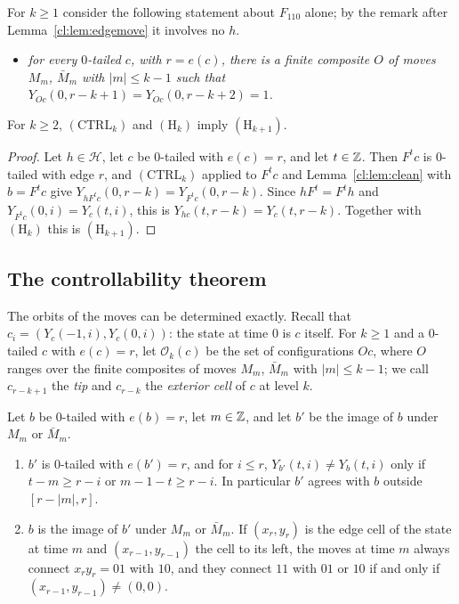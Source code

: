 For $k\ge1$ consider the following statement about $F_{110}$ alone; by the remark after Lemma~\ref{cl:lem:edgemove} it involves no $h$.
\begin{itemize}
\item[$(\mathrm{CTRL}_k)$] \emph{for every $0$-tailed $c$, with $r=e(c)$, there is a finite composite $O$ of moves $M_m$, $\bar M_m$ with $|m|\le k-1$ such that $Y_{Oc}(0,r-k+1)=Y_{Oc}(0,r-k+2)=1$.}
\end{itemize}

\begin{proposition}\label{cl:prop:ctrlstep}
For $k\ge2$, $(\mathrm{CTRL}_k)$ and $(\mathrm H_k)$ imply $(\mathrm H_{k+1})$.
\end{proposition}

\begin{proof}
Let $h\in\mathcal H$, let $c$ be $0$-tailed with $e(c)=r$, and let $t\in\mathbb{Z}$. Then $F^tc$ is $0$-tailed with edge $r$, and $(\mathrm{CTRL}_k)$ applied to $F^tc$ and Lemma~\ref{cl:lem:clean} with $b=F^tc$ give $Y_{hF^tc}(0,r-k)=Y_{F^tc}(0,r-k)$. Since $hF^t=F^th$ and $Y_{F^tc}(0,i)=Y_c(t,i)$, this is $Y_{hc}(t,r-k)=Y_c(t,r-k)$. Together with $(\mathrm H_k)$ this is $(\mathrm H_{k+1})$.
\end{proof}

\subsection{The controllability theorem}\label{cl:sec:ctrl}

The orbits of the moves can be determined exactly. Recall that $c_i=(Y_c(-1,i),Y_c(0,i))$: the state at time $0$ is $c$ itself. For $k\ge1$ and a $0$-tailed $c$ with $e(c)=r$, let $\mathcal O_k(c)$ be the set of configurations $Oc$, where $O$ ranges over the finite composites of moves $M_m$, $\bar M_m$ with $|m|\le k-1$; we call $c_{r-k+1}$ the \emph{tip} and $c_{r-k}$ the \emph{exterior cell} of $c$ at level $k$.

\begin{lemma}\label{cl:lem:movelocal}
Let $b$ be $0$-tailed with $e(b)=r$, let $m\in\mathbb{Z}$, and let $b'$ be the image of $b$ under $M_m$ or $\bar M_m$.
\begin{enumerate}
\item[(a)] $b'$ is $0$-tailed with $e(b')=r$, and for $i\le r$, $Y_{b'}(t,i)\ne Y_b(t,i)$ only if $t-m\ge r-i$ or $m-1-t\ge r-i$. In particular $b'$ agrees with $b$ outside $[r-|m|,r]$.
\item[(b)] $b$ is the image of $b'$ under $M_m$ or $\bar M_m$. If $(x_r,y_r)$ is the edge cell of the state at time $m$ and $(x_{r-1},y_{r-1})$ the cell to its left, the moves at time $m$ always connect $x_ry_r=01$ with $10$, and they connect $11$ with $01$ or $10$ if and only if $(x_{r-1},y_{r-1})\ne(0,0)$.
\end{enumerate}
\end{lemma}

